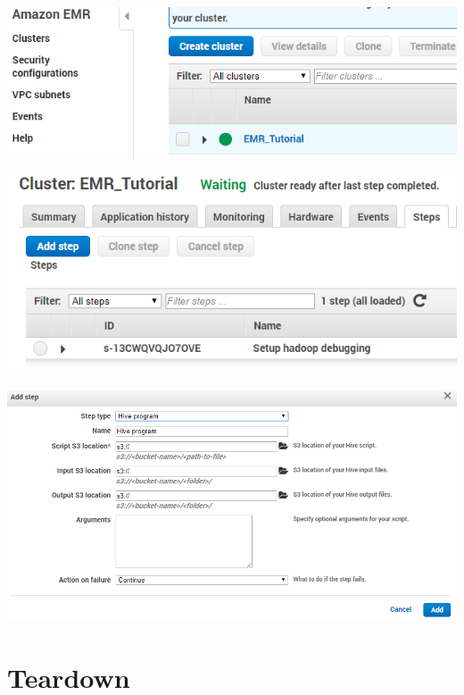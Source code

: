 \begin{center}
\centering\includegraphics[width=\columnwidth]{images/emr_cluster_create.png}

\centering\includegraphics[width=\columnwidth]{images/emr_cluster_steps.png}

\centering\includegraphics[width=\columnwidth]{images/emr_cluster_steps2.png}
\end{center}

\section{Teardown}

